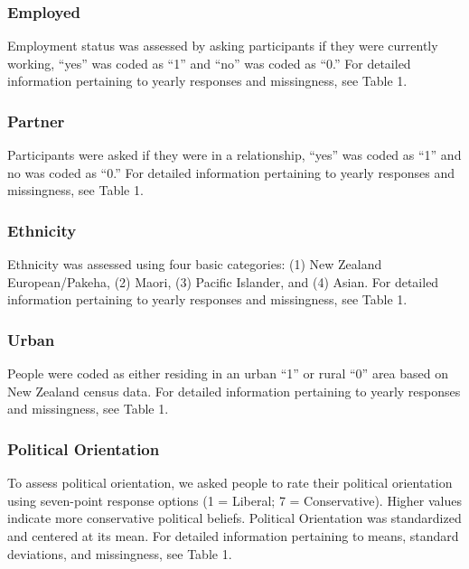 \documentclass[
  english,
  man,floatsintext]{apa6}
\begin{document}
\hypertarget{employed}{%
\subsubsection{Employed}\label{employed}}

Employment status was assessed by asking participants if they were currently working, \enquote{yes} was coded as \enquote{1} and \enquote{no} was coded as \enquote{0.} For detailed information pertaining to yearly responses and missingness, see Table 1.

\hypertarget{partner}{%
\subsubsection{Partner}\label{partner}}

Participants were asked if they were in a relationship, \enquote{yes} was coded as \enquote{1} and no was coded as \enquote{0.} For detailed information pertaining to yearly responses and missingness, see Table 1.

\hypertarget{ethnicity}{%
\subsubsection{Ethnicity}\label{ethnicity}}

Ethnicity was assessed using four basic categories: (1) New Zealand European/Pakeha, (2) Maori, (3) Pacific Islander, and (4) Asian. For detailed information pertaining to yearly responses and missingness, see Table 1.

\hypertarget{urban}{%
\subsubsection{Urban}\label{urban}}

People were coded as either residing in an urban \enquote{1} or rural \enquote{0} area based on New Zealand census data. For detailed information pertaining to yearly responses and missingness, see Table 1.

\hypertarget{political-orientation}{%
\subsubsection{Political Orientation}\label{political-orientation}}

To assess political orientation, we asked people to rate their political orientation using seven-point response options (1 = Liberal; 7 = Conservative). Higher values indicate more conservative political beliefs. Political Orientation was standardized and centered at its mean. For detailed information pertaining to means, standard deviations, and missingness, see Table 1.
\end{document}
